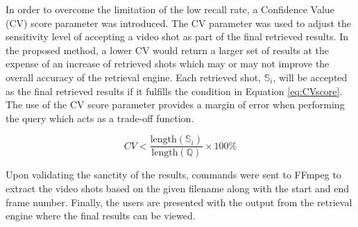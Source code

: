 In order to overcome the limitation of the low recall rate, a Confidence Value (CV) score parameter was introduced. The CV parameter was used to adjust the sensitivity level of accepting a video shot as part of the final retrieved results. In the proposed method, a lower CV would return a larger set of results at the expense of an increase of retrieved shots which may or may not improve the overall accuracy of the retrieval engine. Each retrieved shot, $\mathbb{S}_i$, will be accepted as the final retrieved results if it fulfills the condition in Equation \ref{eq:CVscore}. The use of the CV score parameter provides a margin of error when performing the query which acts as a trade-off function.

\begin{equation}
\label{eq:CVscore}
CV < \frac{\text{length}(\mathbb{S}_i)}{\text{length}(\mathbb{Q})} \times 100\%
\end{equation}



Upon validating the sanctity of the results, commands were sent to FFmpeg to extract the video shots based on the given filename along with the start and end frame number. Finally, the users are presented with the output from the retrieval engine where the final results can be viewed.


